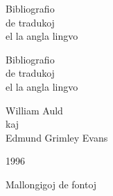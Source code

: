 
\addtolength{\hoffset}{-5mm}
\addtolength{\textwidth}{10mm}
\addtolength{\voffset}{-5mm}
\addtolength{\textheight}{10mm}
\setlength{\parindent}{0mm}
\raggedbottom

\pagestyle{empty}



\begin{center}
\vspace*{5cm}
\Huge\sffamily

Bibliografio \\
de tradukoj \\
el la angla lingvo

\end{center}
\newpage

\begin{center}\Huge
\vspace*{3cm}

Bibliografio \\
de tradukoj \\
el la angla lingvo

\vspace{5cm}\LARGE

William {\sc Auld} \\
kaj \\
Edmund {\sc Grimley Evans}

\vspace{5cm}\Large

1996

\end{center}
\newpage
\small

\begin{center}
\LARGE
Mallongigoj de fontoj
\end{center}


